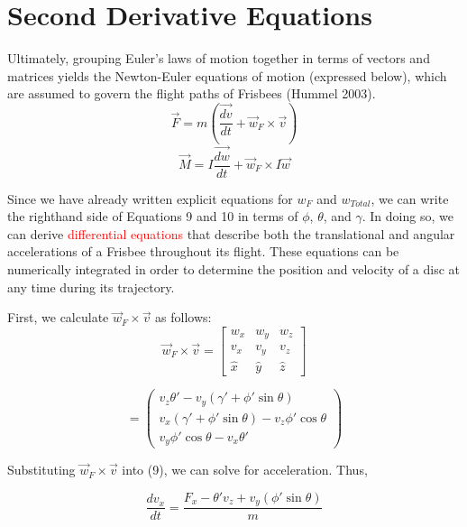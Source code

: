 \documentclass[a4paper,12pt, oneside]{article}
\newcommand{\red}[1]{\textcolor{red}{#1}}
\begin{document}
\section{Second Derivative Equations}

Ultimately, grouping Euler's laws of motion together in terms of vectors and matrices yields the Newton-Euler equations of motion (expressed below), which are assumed to govern the flight paths of Frisbees (Hummel 2003). 
\begin{equation}
\vec{F}=\textit{m}(\dfrac{\vec{dv}}{dt}+\vec{\textit{w}}_F\times\vec{v})
\end{equation}
\begin{equation}
\vec{M}=I\dfrac{\vec{dw}}{dt}+\vec{\textit{w}}_F\times I \vec{w}
\end{equation}

\color{BurntOrange}
Since we have already written explicit equations for $\textit{w}_F$ and $\textit{w}_{Total}$, we can write the righthand side of Equations 9 and 10 in terms of $\phi$, $\theta$, and $\gamma$. In doing so, we can derive \red{differential equations} that describe both the translational and angular accelerations of a Frisbee throughout its flight. These equations can be numerically integrated in order to determine the position and velocity of a disc at any time during its trajectory. 

First, we calculate $\vec{w}_F\times\vec{v}$ as follows: 
\begin{equation*}
\vec{w}_F\times\vec{v}=\begin{bmatrix}
w_x & w_y & w_z \\
v_x & v_y & v_z \\
\hat{x} & \hat{y} & \hat{z}
\end{bmatrix}
\end{equation*}

\begin{equation*}
=\left(\begin{array}{ccc} v_z\theta'-v_y(\gamma'+\phi'\sin\theta) \\ v_x(\gamma'+\phi'\sin\theta)-v_z\phi'\cos\theta \\ v_y\phi'\cos\theta-v_x\theta'\end{array}\right)
\end{equation*}

Substituting $\vec{w}_F\times\vec{v}$ into (9), we can solve for acceleration. Thus,

\begin{equation}
\frac{{dv}_x}{dt}=\frac{{F}_x-\theta'v_z+v_y(\phi'\sin\theta)}{m}
\end{equation}
\end{document}
